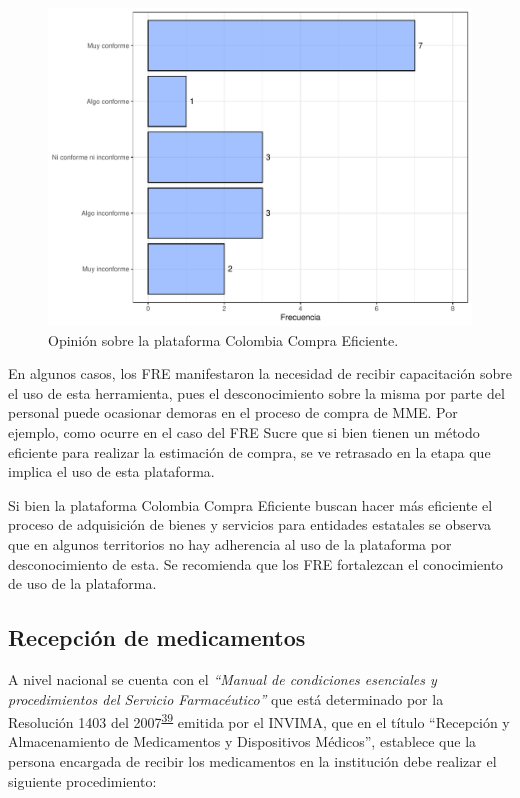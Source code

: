 \documentclass[
]{book}
\begin{document}
\begin{figure}[t]

{\centering \includegraphics[width=1\linewidth]{InformeFinal_files/figure-latex/ColombiaCompra-1} 

}

\caption{Opinión sobre la plataforma Colombia Compra Eficiente.}\label{fig:ColombiaCompra}
\end{figure}

En algunos casos, los FRE manifestaron la necesidad de recibir capacitación sobre el uso de esta herramienta, pues el desconocimiento sobre la misma por parte del personal puede ocasionar demoras en el proceso de compra de MME. Por ejemplo, como ocurre en el caso del FRE Sucre que si bien tienen un método eficiente para realizar la estimación de compra, se ve retrasado en la etapa que implica el uso de esta plataforma.

Si bien la plataforma Colombia Compra Eficiente buscan hacer más eficiente el proceso de adquisición de bienes y servicios para entidades estatales se observa que en algunos territorios no hay adherencia al uso de la plataforma por desconocimiento de esta. Se recomienda que los FRE fortalezcan el conocimiento de uso de la plataforma.

\hypertarget{recepciuxf3n-de-medicamentos}{%
\subsection{Recepción de medicamentos}\label{recepciuxf3n-de-medicamentos}}

A nivel nacional se cuenta con el \emph{``Manual de condiciones esenciales y procedimientos del Servicio Farmacéutico''} que está determinado por la Resolución 1403 del 2007\textsuperscript{\protect\hyperlink{ref-MinisteriodeSaludyProteccionSocial2007}{39}} emitida por el INVIMA, que en el título ``Recepción y Almacenamiento de Medicamentos y Dispositivos Médicos'', establece que la persona encargada de recibir los medicamentos en la institución debe realizar el siguiente procedimiento:
\end{document}
